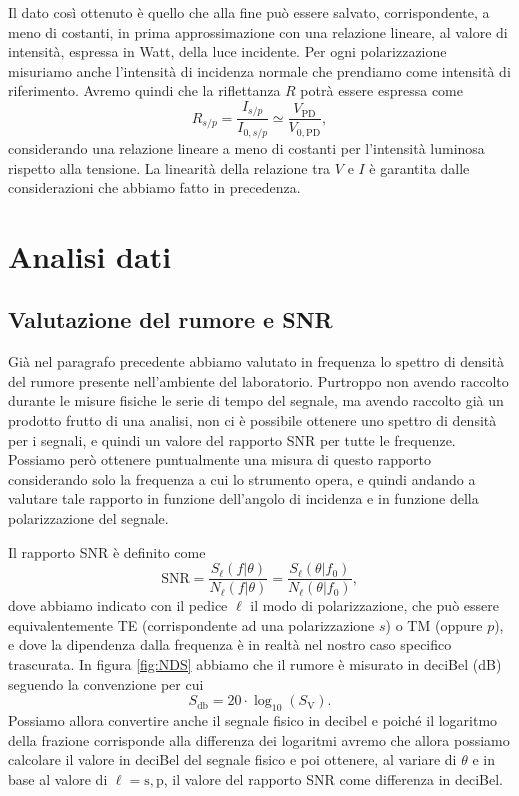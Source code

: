 \documentclass[
    prb,altaffilletter,citeautoscript,
    amsmath,amssymb,
    showpacs,showkeys,floatfix,
    reprint
]{revtex4-1}
\begin{document}
Il dato così ottenuto è quello che alla fine può essere salvato, corrispondente, a meno di costanti, in prima approssimazione con una relazione lineare, al valore di intensità, espressa in Watt, della luce incidente. Per ogni polarizzazione misuriamo anche l'intensità di incidenza normale che prendiamo come intensità di riferimento. Avremo quindi che la riflettanza $R$ potrà essere espressa come \begin{equation}
    R_{s/p} = \frac{I_{s/p}}{I_{0,s/p}} \simeq \frac{V_\text{PD}}{V_{0,\text{PD}}},\label{eq:R_from I/I_0}
\end{equation} considerando una relazione lineare a meno di costanti per l'intensità luminosa rispetto alla tensione. La linearità della relazione tra $V$ e $I$ è garantita dalle considerazioni che abbiamo fatto in precedenza. 


\section{Analisi dati}

\subsection{Valutazione del rumore e SNR}

Già  nel paragrafo precedente abbiamo valutato in frequenza lo spettro di densità del rumore presente nell'ambiente del laboratorio. Purtroppo non avendo raccolto durante le misure fisiche le serie di tempo del segnale, ma avendo raccolto già un prodotto frutto di una analisi, non ci è possibile ottenere uno spettro di densità per i segnali, e quindi un valore del rapporto SNR per tutte le frequenze. Possiamo però ottenere puntualmente una misura di questo rapporto considerando solo la frequenza a cui lo strumento opera, e quindi andando a valutare tale rapporto in funzione dell'angolo di incidenza e in funzione della polarizzazione del segnale. 

Il rapporto SNR è definito come \begin{equation}
    \text{SNR} = \frac{S_\ell(f|\theta)}{N_\ell (f|\theta)} = \frac{S_\ell(\theta | f_0)}{N_\ell (\theta | f_0)},\label{eq:SNR}
\end{equation} dove abbiamo indicato con il pedice $\ell$ il modo di polarizzazione, che può essere equivalentemente TE (corrispondente ad una polarizzazione $s$) o TM (oppure $p$), e dove la dipendenza dalla frequenza è in realtà nel nostro caso specifico trascurata. In figura \ref{fig:NDS} abbiamo che il rumore è misurato in deciBel (dB) seguendo la convenzione per cui \begin{equation}
    S_{\si{\decibel}} = 20 \cdot \log_{10}(S_{\si{\volt}}).
\end{equation} Possiamo allora convertire anche il segnale fisico in decibel e poiché il logaritmo della frazione corrisponde alla differenza dei logaritmi avremo che allora possiamo calcolare il valore in deciBel del segnale fisico e poi ottenere, al variare di $\theta$ e in base al valore di $\ell=\mathrm{s,p}$, il valore del rapporto SNR come differenza in deciBel. 
\end{document}
